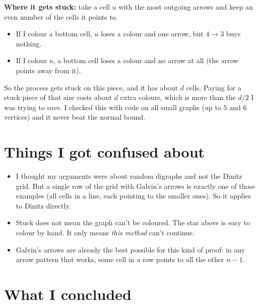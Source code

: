 \documentclass[11pt,a4paper]{article}
\begin{document}
\textbf{Where it gets stuck:} take a cell $u$ with the most outgoing arrows and keep an even number of the cells it points to.

\begin{center}
\end{center}

\begin{itemize}[leftmargin=1.4em]
    \item If I colour a bottom cell, $u$ loses a colour and one arrow, but $4\to3$ buys nothing.
    \item If I colour $u$, a bottom cell loses a colour and no arrow at all (the arrow points away from it).
\end{itemize}

So the process gets stuck on this piece, and it has about $d$ cells. Paying for a stuck piece of that size costs about $d$ extra colours, which is more than the $d/2$ I was trying to save. I checked this with code on all small graphs (up to 5 and 6 vertices) and it never beat the normal bound.

\section*{Things I got confused about}

\begin{itemize}[leftmargin=1.4em]
    \item I thought my arguments were about random digraphs and not the Dinitz grid. But a single row of the grid with Galvin's arrows is exactly one of those examples (all cells in a line, each pointing to the smaller ones). So it applies to Dinitz directly.
    \item Stuck does not mean the graph can't be coloured. The star above is easy to colour by hand. It only means \emph{this method} can't continue.
    \item Galvin's arrows are already the best possible for this kind of proof: in any arrow pattern that works, some cell in a row points to all the other $n-1$.
\end{itemize}

\section*{What I concluded}
\end{document}
